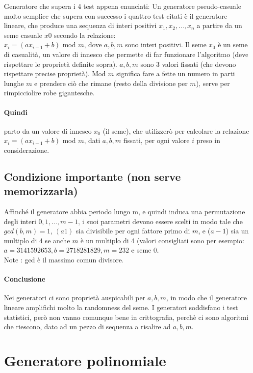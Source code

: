 Generatore che supera i 4 test appena enunciati: 
Un generatore pseudo-casuale molto semplice che supera con successo i quattro test citati è il generatore lineare, che produce una sequenza di interi positivi $x_1, x_2, ..., x_n$ a
partire da un seme casuale $x0$ secondo la relazione:\\
$x_i = (a x_{i-1} + b)$ mod $m$, dove $a, b, m$ sono interi positivi. Il seme $x_0$ è un seme di casualità, un valore di innesco che permette di far funzionare l'algoritmo (deve rispettare le proprietà definite sopra).
$a, b, m$ sono 3 valori fissati (che devono rispettare precise proprietà).
Mod $m$ significa fare a fette un numero in parti lunghe $m$ e prendere ciò che rimane (resto della divisione per $m$), serve per rimpicciolire robe gigantesche. 
\paragraph{Quindi} parto da un valore di innesco $x_0$ (il seme), che utilizzerò per calcolare la relazione $x_i = (a x_{i-1} + b)$ mod $m$, dati $a, b, m$ fissati, per ogni valore $i$ preso in considerazione. 

\subsection{Condizione importante (non serve memorizzarla)}

Affinché il generatore abbia periodo lungo m, e quindi induca una permutazione degli interi $0, 1, ..., m - 1$, i
suoi parametri devono essere scelti in modo tale che $gcd(b, m) = 1$, $(a  1)$ sia divisibile per ogni fattore primo di $m$, e ($a - 1$) sia un multiplo di 4 se anche $m$ è un multiplo di 4 (valori consigliati sono per esempio: $a = 3141592653, b = 2718281829, m = 232$ e seme 0.\\
Note : gcd è il massimo comun divisore.

\paragraph{Conclusione}

Nei generatori ci sono proprietà auspicabili per $a, b, m$, in modo che il generatore lineare amplifichi molto la randomness del seme. I generatori soddisfano i test statistici, però non vanno comunque bene in crittografia, perchè ci sono algoritmi che riescono, dato ad un pezzo di sequenza a risalire ad $a, b, m$.

\section{Generatore polinomiale}

